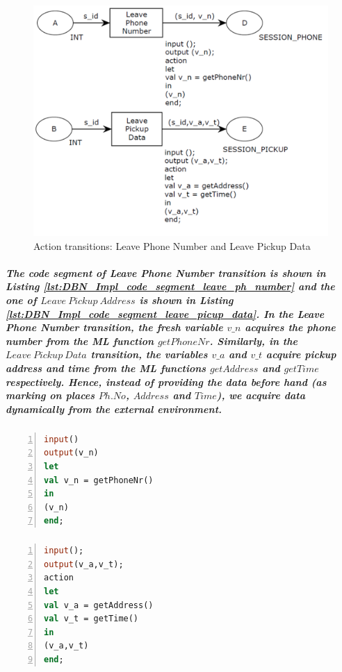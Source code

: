 \begin{figure}[!htbp]
	\centering
	\includegraphics[scale = 0.35]{DBN_Impl_Data_Acquisition.pdf}
	\caption{Action transitions: Leave Phone Number and Leave Pickup Data}
	\label{fig:DBN_Impl_Data_Acquisition}
\end{figure}

\subparagraph*{\textnormal{The code segment of \textit{Leave Phone Number} transition is shown in Listing \ref{lst:DBN_Impl_code_segment_leave_ph_number} and the one of $\mathit{Leave\ Pickup\ Address}$ is shown in Listing \ref{lst:DBN_Impl_code_segment_leave_picup_data}. In the \textit{Leave Phone Number} transition, the fresh variable $\mathit{v\_n}$ acquires the phone number from the ML function $\mathit{getPhoneNr}$. Similarly, in the $\mathit{Leave\ Pickup\ Data}$ transition, the variables $\mathit{v\_a}$ and $\mathit{v\_t}$ acquire pickup address and time from the ML functions $\mathit{getAddress}$ and $\mathit{getTime}$ respectively. Hence, instead of providing the data before hand (as marking on places $\mathit{Ph. No}$, $\mathit{Address}$ and $\mathit{Time}$), we acquire data dynamically from the external environment.}}
\subparagraph*{}
\begin{lstlisting}[showstringspaces=false, language = ML, caption = Code segment of transition: $\mathit{LEAVE\ PHONE\ NUMBER}$, captionpos=b, label = lst:DBN_Impl_code_segment_leave_ph_number, numbers=left,
stepnumber=1]
input()
output(v_n)
let
val v_n = getPhoneNr()
in
(v_n)
end;
\end{lstlisting}

\subparagraph*{}
\begin{lstlisting}[showstringspaces=false, language = ML, caption = Code segment of transition: $\mathit{LEAVE\ PICKUP\ DATA}$, captionpos=b, label = lst:DBN_Impl_code_segment_leave_picup_data, numbers=left,
stepnumber=1]
input();
output(v_a,v_t);
action
let
val v_a = getAddress()
val v_t = getTime()
in
(v_a,v_t)
end;
\end{lstlisting}

